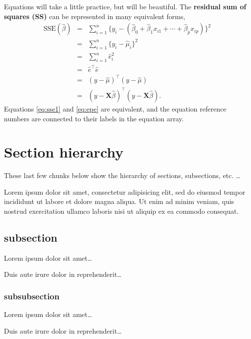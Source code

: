 \documentclass[letterpaper,12pt]{article}\usepackage[]{graphicx}\usepackage[]{color}
\begin{document}
Equations will take a little practice, but will be beautiful.
The {\bf residual sum of squares (SS)} can be represented in many equivalent forms,
\begin{eqnarray}
\label{eq:sse1}
  \textrm{SSE}(\hat{\beta})
    & = &
  \sum_{i=1}^{n} \{ y_{i} - (\hat{\beta}_{0} + \hat{\beta}_{1} x_{i 1} + \cdots + \hat{\beta}_{p} x_{ip}) \}^2
\\ %
    & = &
  \sum_{i=1}^{n} \{ y_{i} - \hat{\mu}_{i} \}^2
\nonumber\\ %
    & = &
  \sum_{i=1}^{n} \hat{e}_{i}^2
\nonumber\\ %
\label{eq:epe}
    & = &
  \hat{e}^{\top} \hat{e}
\\ %
    & = &
  (y - \hat{\mu})^{\top} (y - \hat{\mu})
\nonumber\\ %
    & = &
  (y - \mathbf{X} \hat{\beta})^{\top} (y - \mathbf{X} \hat{\beta})
  .
\nonumber
\end{eqnarray}
Equations \eqref{eq:sse1} and \eqref{eq:epe} are equivalent, and the equation
  reference numbers are connected to their labels in the equation array.


\section{Section hierarchy}
These last few chunks below show the hierarchy of sections, subsections, etc. \ldots

Lorem ipsum dolor sit amet, consectetur adipisicing elit, sed do eiusmod tempor incididunt ut labore et dolore magna aliqua. Ut enim ad minim veniam, quis nostrud exercitation ullamco laboris nisi ut aliquip ex ea commodo consequat.

\subsection{subsection}
Lorem ipsum dolor sit amet\ldots

Duis aute irure dolor in reprehenderit\ldots

\subsubsection{subsubsection}
Lorem ipsum dolor sit amet\ldots

Duis aute irure dolor in reprehenderit\ldots
\end{document}
